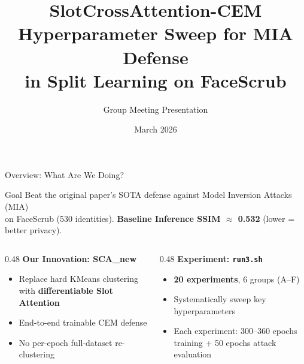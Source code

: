 \documentclass[aspectratio=169, 10pt]{beamer}
\title[SCA-CEM Hyperparameter Sweep]{\textbf{SlotCrossAttention-CEM}\\Hyperparameter Sweep for MIA Defense\\in Split Learning on FaceScrub}
\author{Group Meeting Presentation}
\date{March 2026}
\begin{document}
\begin{frame}
\titlepage
\end{frame}

\begin{frame}{Overview: What Are We Doing?}

\begin{block}{Goal}
Beat the original paper's SOTA defense against Model Inversion Attacks (MIA)\\
on FaceScrub (530 identities). \textbf{Baseline Inference SSIM $\approx$ 0.532} (lower = better privacy).
\end{block}

\vspace{0.3cm}

\begin{columns}[T]
\begin{column}{0.48\textwidth}
\textbf{Our Innovation: SCA\_new}
\begin{itemize}
    \item Replace hard KMeans clustering with \textbf{differentiable Slot Attention}
    \item End-to-end trainable CEM defense
    \item No per-epoch full-dataset re-clustering
\end{itemize}
\end{column}
\begin{column}{0.48\textwidth}
\textbf{Experiment: \texttt{run3.sh}}
\begin{itemize}
    \item \textbf{20 experiments}, 6 groups (A--F)
    \item Systematically sweep key hyperparameters
    \item Each experiment: 300--360 epochs training + 50 epochs attack evaluation
\end{itemize}
\end{column}
\end{columns}

\end{frame}
\end{document}
